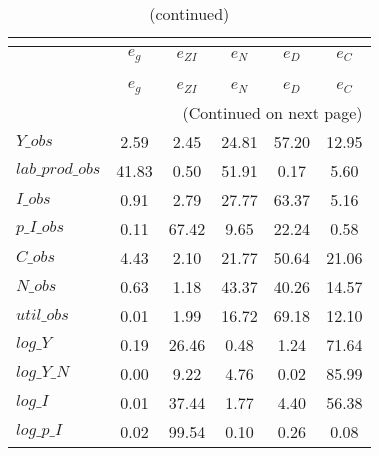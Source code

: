  
\begin{center}
\begin{longtable}{lccccc} 
\caption{VARIANCE DECOMPOSITION (in percent)}\\
 \label{Table:th_var_decomp_uncond}\\
\toprule 
$                $	 & 	 $       {e_g}$	 & 	 $    {e_{ZI}}$	 & 	 $       {e_N}$	 & 	 $       {e_D}$	 & 	 $       {e_C}$\\
\midrule \endfirsthead 
\caption{(continued)}\\
 \toprule \\ 
$                $	 & 	 $       {e_g}$	 & 	 $    {e_{ZI}}$	 & 	 $       {e_N}$	 & 	 $       {e_D}$	 & 	 $       {e_C}$\\
\midrule \endhead 
\midrule \multicolumn{6}{r}{(Continued on next page)} \\ \bottomrule \endfoot 
\bottomrule \endlastfoot 
$Y\_obs          $	 & 	        2.59	 & 	        2.45	 & 	       24.81	 & 	       57.20	 & 	       12.95 \\ 
$lab\_prod\_obs  $	 & 	       41.83	 & 	        0.50	 & 	       51.91	 & 	        0.17	 & 	        5.60 \\ 
$I\_obs          $	 & 	        0.91	 & 	        2.79	 & 	       27.77	 & 	       63.37	 & 	        5.16 \\ 
$p\_I\_obs       $	 & 	        0.11	 & 	       67.42	 & 	        9.65	 & 	       22.24	 & 	        0.58 \\ 
$C\_obs          $	 & 	        4.43	 & 	        2.10	 & 	       21.77	 & 	       50.64	 & 	       21.06 \\ 
$N\_obs          $	 & 	        0.63	 & 	        1.18	 & 	       43.37	 & 	       40.26	 & 	       14.57 \\ 
$util\_obs       $	 & 	        0.01	 & 	        1.99	 & 	       16.72	 & 	       69.18	 & 	       12.10 \\ 
$log\_Y          $	 & 	        0.19	 & 	       26.46	 & 	        0.48	 & 	        1.24	 & 	       71.64 \\ 
$log\_Y\_N       $	 & 	        0.00	 & 	        9.22	 & 	        4.76	 & 	        0.02	 & 	       85.99 \\ 
$log\_I          $	 & 	        0.01	 & 	       37.44	 & 	        1.77	 & 	        4.40	 & 	       56.38 \\ 
$log\_p\_I       $	 & 	        0.02	 & 	       99.54	 & 	        0.10	 & 	        0.26	 & 	        0.08 \\ 

\end{longtable}
\end{center}
